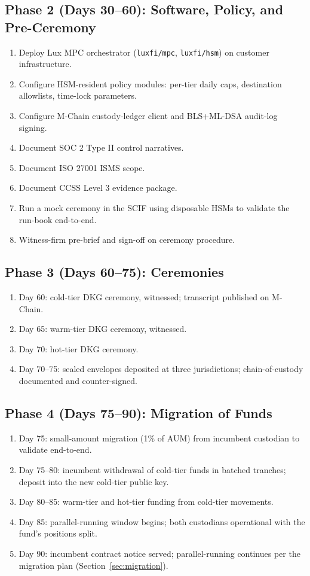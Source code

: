 \subsection{Phase 2 (Days 30--60): Software, Policy, and Pre-Ceremony}

\begin{enumerate}[nosep]
\item Deploy Lux MPC orchestrator
(\texttt{luxfi/mpc}, \texttt{luxfi/hsm}) on customer infrastructure.
\item Configure HSM-resident policy modules: per-tier daily caps,
destination allowlists, time-lock parameters.
\item Configure M-Chain custody-ledger client and BLS+ML-DSA
audit-log signing.
\item Document SOC 2 Type II control narratives.
\item Document ISO 27001 ISMS scope.
\item Document CCSS Level 3 evidence package.
\item Run a mock ceremony in the SCIF using disposable HSMs to
validate the run-book end-to-end.
\item Witness-firm pre-brief and sign-off on ceremony procedure.
\end{enumerate}

\subsection{Phase 3 (Days 60--75): Ceremonies}

\begin{enumerate}[nosep]
\item Day 60: cold-tier DKG ceremony, witnessed; transcript published
on M-Chain.
\item Day 65: warm-tier DKG ceremony, witnessed.
\item Day 70: hot-tier DKG ceremony.
\item Day 70--75: sealed envelopes deposited at three jurisdictions;
chain-of-custody documented and counter-signed.
\end{enumerate}

\subsection{Phase 4 (Days 75--90): Migration of Funds}

\begin{enumerate}[nosep]
\item Day 75: small-amount migration (1\% of AUM) from incumbent
custodian to validate end-to-end.
\item Day 75--80: incumbent withdrawal of cold-tier funds in batched
tranches; deposit into the new cold-tier public key.
\item Day 80--85: warm-tier and hot-tier funding from cold-tier
movements.
\item Day 85: parallel-running window begins; both custodians
operational with the fund's positions split.
\item Day 90: incumbent contract notice served; parallel-running
continues per the migration plan (Section~\ref{sec:migration}).
\end{enumerate}


